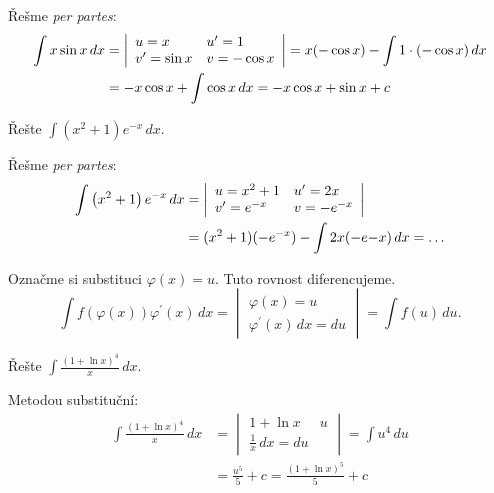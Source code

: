 \begin{reseni}
Řešme \textit{per partes}:
\begin{align*}
\int x \sin x \, dx &=\left |\begin{array}{l l}
    u=x & u^\prime= 1\\
    v^\prime = \sin x & v=-\cos x
\end{array} \right | = x(-\cos x)-\int 1\cdot(-\cos x)\, dx \\
&= -x\cos x+\int \cos x \, dx=-x \cos x +\sin x+c
\end{align*}
\end{reseni}

\begin{priklad}
Řešte $\int (x^2+1)e^{-x}\, dx.$
\end{priklad}

\begin{reseni}
Řešme \textit{per partes}:
\begin{align*}
    \int \left ( x^2+1 \right )e^{-x}\, dx &= \left |\begin{array}{l l}
        u=x^2+1 & u^\prime= 2x\\
        v^\prime = e^{-x} & v=-e^{-x}
    \end{array} \right | \\
    &= (x^2+1)(-e^{-x})-\int 2x(-e{-x})\, dx = \dots
\end{align*}
\end{reseni}

\begin{pozn}
    Označme si substituci $\varphi(x)=u.$ Tuto rovnost diferencujeme.
    $$\int f(\varphi(x))\varphi^\prime(x)\, dx=\begin{vmatrix}
        \varphi(x)=u \\
        \varphi^\prime(x) \, dx=du
    \end{vmatrix}=\int f(u)\, du.$$
\end{pozn}

\begin{priklad}
Řešte $\int \frac{(1+\ln x)^4}{x}\, dx.$
\end{priklad}

\begin{reseni}
Metodou substituční:
\begin{align*}
    \int \frac{(1+\ln x)^4}{x}\, dx &= \begin{vmatrix}
        1+\ln x&u \\
        \frac{1}{x}\, dx=du
    \end{vmatrix}=\int u^4\, du \\
    &=\frac{u^5}{5}+c=\frac{(1+\ln x)^5}{5}+c
\end{align*}
\end{reseni}

